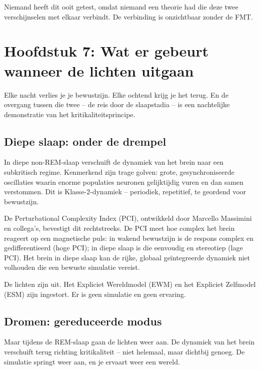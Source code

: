 \documentclass[11pt, twoside, openright]{book}
\begin{document}
Niemand heeft dit ooit getest, omdat niemand een theorie had die deze twee verschijnselen met elkaar verbindt. De verbinding is onzichtbaar zonder de FMT.


\chapter*{Hoofdstuk 7: Wat er gebeurt wanneer de lichten uitgaan}

Elke nacht verlies je je bewustzijn. Elke ochtend krijg je het terug. En de overgang tussen die twee -- de reis door de slaapstadia -- is een nachtelijke demonstratie van het kritikaliteitsprincipe.

\section*{Diepe slaap: onder de drempel}

In diepe non-REM-slaap verschuift de dynamiek van het brein naar een subkritisch regime. Kenmerkend zijn trage golven: grote, gesynchroniseerde oscillaties waarin enorme populaties neuronen gelijktijdig vuren en dan samen verstommen. Dit is Klasse-2-dynamiek -- periodiek, repetitief, te geordend voor bewustzijn.

De Perturbational Complexity Index (PCI), ontwikkeld door Marcello Massimini en collega's, bevestigt dit rechtstreeks. De PCI meet hoe complex het brein reageert op een magnetische puls: in wakend bewustzijn is de respons complex en gedifferentieerd (hoge PCI); in diepe slaap is die eenvoudig en stereotiep (lage PCI). Het brein in diepe slaap kan de rijke, globaal geïntegreerde dynamiek niet volhouden die een bewuste simulatie vereist.

De lichten zijn uit. Het Expliciet Wereldmodel (EWM) en het Expliciet Zelfmodel (ESM) zijn ingestort. Er is geen simulatie en geen ervaring.

\section*{Dromen: gereduceerde modus}

Maar tijdens de REM-slaap gaan de lichten weer aan. De dynamiek van het brein verschuift terug richting kritikaliteit -- niet helemaal, maar dichtbij genoeg. De simulatie springt weer aan, en je ervaart weer een wereld.
\end{document}
